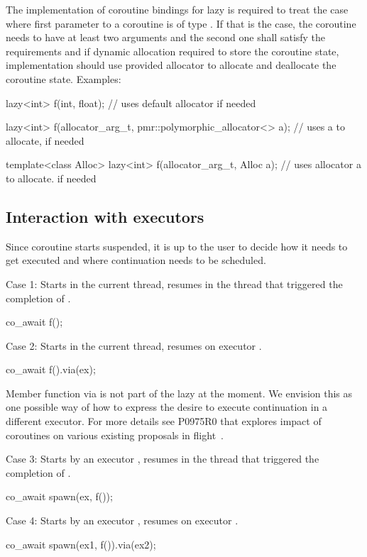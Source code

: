 The implementation of coroutine bindings for lazy is required to treat the case where first parameter to a coroutine is of type . If that is the case, the coroutine needs to have at least two arguments and the second one shall satisfy the  requirements and if dynamic allocation required to store the coroutine state, implementation should use provided allocator to allocate and deallocate the coroutine state. Examples:
\begin{codeblock}
lazy<int> f(int, float); // uses default allocator if needed

lazy<int> f(allocator_arg_t, pmr::polymorphic_allocator<> a); // uses a to allocate, if needed

template<class Alloc>
lazy<int> f(allocator_arg_t, Alloc a); // uses allocator a to allocate. if needed
\end{codeblock}

\subsection{Interaction with executors}
Since coroutine starts suspended, it is up to the user to decide how it needs to get executed and where continuation needs to be scheduled.

Case 1: Starts in the current thread, resumes in the thread that triggered the completion of .
\begin{codeblock}
co_await f();
\end{codeblock}

Case 2: Starts in the current thread, resumes on executor .
\begin{codeblock}
co_await f().via(ex);
\end{codeblock}
\begin{note}
Member function via is not part of the lazy at the moment. We envision this as one possible way of how to express the desire to execute continuation in a different executor. For more details see P0975R0 that explores impact of coroutines on various existing proposals in flight~\cite{P0975R0}.
\end{note}

Case 3: Starts by an executor , resumes in the thread that triggered the completion of .
\begin{codeblock}
co_await spawn(ex, f());
\end{codeblock}

Case 4: Starts by an executor , resumes on executor .
\begin{codeblock}
co_await spawn(ex1, f()).via(ex2);
\end{codeblock}


